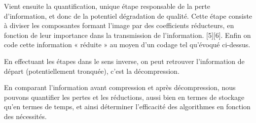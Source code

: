 \documentclass{article}
\begin{document}
Vient ensuite la quantification, unique étape responsable de la perte d'information, et donc de la potentiel dégradation de qualité. Cette étape consiste à diviser les composantes formant l'image par des coefficients réducteurs, en fonction de leur importance dans la transmission de l'information. [5][6]. Enfin on code cette information « réduite » au moyen d'un codage tel qu'évoqué ci-dessus.

En effectuant les étapes dans le sens inverse, on peut retrouver l'information de départ (potentiellement tronquée), c'est la décompression.

En comparant l'information avant compression et après décompression, nous pouvons quantifier les pertes et les réductions, aussi bien en termes de stockage qu'en termes de temps, et ainsi déterminer l'efficacité des algorithmes en fonction des nécessités.
\end{document}
